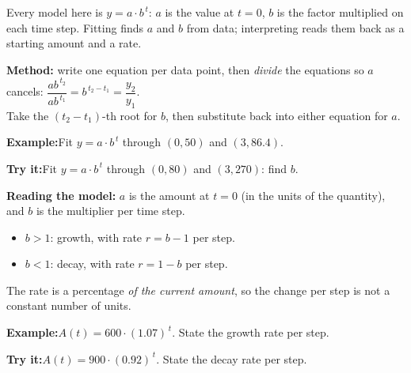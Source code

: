 \documentclass[12pt]{article}
\begin{document}

\noindent\small Every model here is $y = a \cdot b^{\,t}$: $a$ is the value at $t = 0$,
$b$ is the factor multiplied on each time step. Fitting finds $a$ and $b$ from data;
interpreting reads them back as a starting amount and a rate.\normalsize

\begin{formulabox}\textbf{Method:} write one equation per data point, then \emph{divide}
the equations so $a$ cancels:
$\dfrac{a b^{\,t_2}}{a b^{\,t_1}} = b^{\,t_2 - t_1} = \dfrac{y_2}{y_1}$.\\[3pt]
Take the $(t_2 - t_1)$-th root for $b$, then substitute back into either equation for $a$.
\end{formulabox}
\begin{examplebox}\textbf{Example:}\quad Fit $y = a \cdot b^{\,t}$ through $(0, 50)$ and $(3, 86.4)$.
\end{examplebox}
\begin{tryitbox}\textbf{Try it:}\quad Fit $y = a \cdot b^{\,t}$ through $(0, 80)$ and $(3, 270)$: find $b$.\\[2pt]
\end{tryitbox}

\begin{formulabox}\textbf{Reading the model:} $a$ is the amount at $t = 0$ (in the units of
the quantity), and $b$ is the multiplier per time step.
\begin{itemize}[itemsep=1pt, topsep=2pt]
  \item $b > 1$: growth, with rate $r = b - 1$ per step.
  \item $b < 1$: decay, with rate $r = 1 - b$ per step.
\end{itemize}
The rate is a percentage \emph{of the current amount}, so the change per step is not a
constant number of units.
\end{formulabox}
\begin{examplebox}\textbf{Example:}\quad $A(t) = 600 \cdot (1.07)^{\,t}$. State the growth rate per step.
\end{examplebox}
\begin{tryitbox}\textbf{Try it:}\quad $A(t) = 900 \cdot (0.92)^{\,t}$. State the decay rate per step.\\[2pt]
\end{tryitbox}
\end{document}
